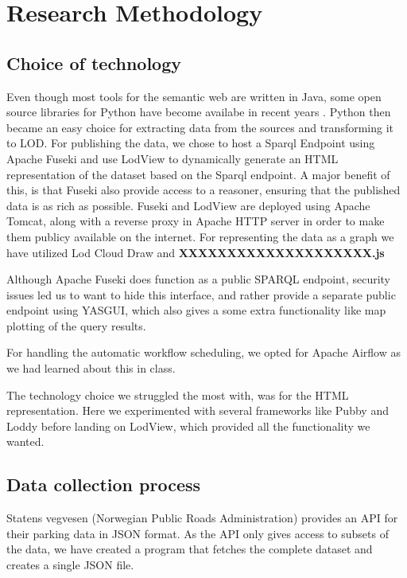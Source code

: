 \chapter{Research Methodology}

\section{Choice of technology}
Even though most tools for the semantic web are written in Java, some open source libraries for Python have become availabe in recent years \cite{w3java}. Python then became an easy choice for extracting data from the sources and transforming it to LOD. For publishing the data, we chose to host a Sparql Endpoint using Apache Fuseki and use LodView to dynamically generate an HTML representation of the dataset based on the Sparql endpoint. A major benefit of this, is that Fuseki also provide access to a reasoner, ensuring that the published data is as rich as possible. Fuseki and LodView are deployed using Apache Tomcat, along with a reverse proxy in Apache HTTP server in order to make them publicy available on the internet. For representing the data as a graph we have utilized Lod Cloud Draw and \textbf{XXXXXXXXXXXXXXXXXXXX.js}

\vspace{5mm}

Although Apache Fuseki does function as a public SPARQL endpoint, security issues led us to want to hide this interface, and rather provide a separate public endpoint using YASGUI, which also gives a some extra functionality like map plotting of the query results.

\vspace{5mm}

For handling the automatic workflow scheduling, we opted for Apache Airflow as we had learned about this in class.

\vspace{5mm}

The technology choice we struggled the most with, was for the HTML representation. Here we experimented with several frameworks like Pubby and Loddy before landing on LodView, which provided all the functionality we wanted.

\section{Data collection process}
Statens vegvesen (Norwegian Public Roads Administration) \cite{statensvegvesen} provides an API for their parking data in JSON format. As the API only gives access to subsets of the data, we have created a program that fetches the complete dataset and creates a single JSON file.

